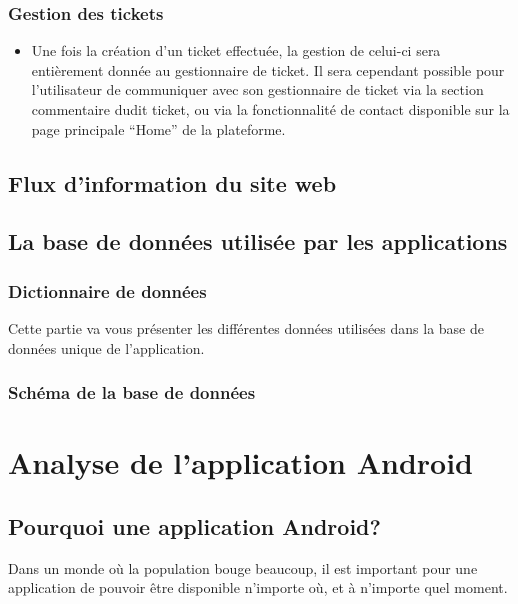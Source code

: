 \documentclass[12pt,table,a4paper]{report}
\begin{document}
\subsubsection{Gestion des tickets}
\begin{itemize}
	\item{Une fois la création d'un ticket effectuée, la gestion de celui-ci sera entièrement donnée au gestionnaire de ticket. Il sera cependant possible pour l'utilisateur de communiquer avec son gestionnaire de ticket via la section commentaire dudit ticket, ou via la fonctionnalité de contact disponible sur la page principale "`Home"' de la plateforme.}
\end{itemize}

\subsection{Flux d'information du site web}

\subsection{La base de données utilisée par les applications}

\subsubsection{Dictionnaire de données}
Cette partie va vous présenter les différentes données utilisées dans la base de données unique de l'application.

\subsubsection{Schéma de la base de données}
\missingfigure{}

\section{Analyse de l'application Android}

\subsection{Pourquoi une application Android?}
Dans un monde où la population bouge beaucoup, il est important pour une application de pouvoir être disponible n'importe où, et à n'importe quel moment.
\end{document}
